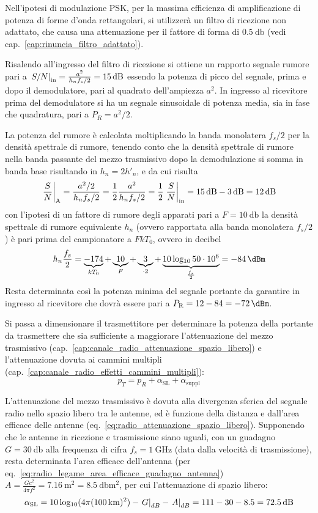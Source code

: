 Nell'ipotesi di modulazione \ac{PSK}, per la massima efficienza di amplificazione di potenza di forme d'onda rettangolari, si utilizzerà un filtro di ricezione non adattato, che causa una attenuazione per il fattore di forma di $\SI{0.5}{\decibel}$ (vedi cap.~\ref{cap:rinuncia_filtro_adattato}). 

Risalendo all'ingresso del filtro di ricezione si ottiene un rapporto segnale rumore pari a $\restrict{S/N}{\text{in}}=\frac{a^2}{h_n f_s/2}=\SI{15}{\decibel}$ essendo la potenza di picco del segnale, prima e dopo il demodulatore, pari al quadrato dell'ampiezza $a^2$. In ingresso al ricevitore prima del demodulatore si ha un segnale sinusoidale di potenza media, sia in fase che quadratura, pari a $P_R=a^2/2$.

La potenza del rumore è calcolata moltiplicando la banda monolatera $f_s/2$ per la densità spettrale di rumore, tenendo conto che la densità spettrale di rumore nella banda passante del mezzo trasmissivo dopo la demodulazione si somma in banda base risultando in $h_n=2 h'_n$, e da cui risulta
\[\restrict{\frac{S}{N}}{\text{A}}=\frac{a^2/2}{h_n f_s/2}=\frac{1}{2}\frac{a^2}{h_n f_s/2}=\frac{1}{2}\restrict{\frac{S}{N}}{\text{in}}=\SI{15}{\decibel}-\SI{3}{\decibel}=\SI{12}{\decibel}\]
con l'ipotesi di un fattore di rumore degli apparati pari a $F=\SI{10}{\decibel}$ la densità spettrale di rumore equivalente $h_n$ (ovvero rapportata alla banda monolatera $f_s/2$) è pari prima del campionatore a $F k T_0$, ovvero in decibel
\[h_n \frac{f_s}{2}=\underbrace{-174}_{k T_0}+\underbrace{10}_{F}+\underbrace{3}_{\cdot 2}+\underbrace{10\Log{50\cdot 10^6}}_{\frac{f_s}{2}}=\SI{-84}{\dBm}\]
Resta determinata così la potenza minima del segnale portante da garantire in ingresso al ricevitore che dovrà essere pari a $P_\text{R}=12-84=\SI{-72}{\dBm}$.

Si passa a dimensionare il trasmettitore per determinare la potenza della portante da trasmettere che sia sufficiente a maggiorare l'attenuazione del mezzo trasmissivo (cap.~\ref{cap:canale_radio_attenuazione_spazio_libero}) e l'attenuazione dovuta ai cammini multipli (cap.~\ref{cap:canale_radio_effetti_cammini_multipli}):
\[p_T=p_R+\alpha_\text{SL}+\alpha_\text{suppl}\]

L'attenuazione del mezzo trasmissivo è dovuta alla divergenza sferica del segnale radio nello spazio libero tra le antenne, ed è funzione della distanza e dall'area efficace delle antenne (eq.~\ref{eq:radio_attenuazione_spazio_libero}). Supponendo che le antenne in ricezione e trasmissione siano uguali, con un guadagno $G=\SI{30}{\decibel}$ alla frequenza di cifra $f_s=\SI{1}{\giga\hertz}$ (data dalla velocità di trasmissione), resta determinata l'area efficace dell'antenna (per eq.~\ref{eq:radio_legame_area_efficace_guadagno_antenna}) $A=\frac{G c^2}{4\pi f^2}=\SI{7.16}{\meter\squared}=\SI{8.5}{\decibel\meter\squared}$, per cui l'attenuazione di spazio libero:
\[\alpha_\text{SL}=10\Log(4\pi(\SI{100}{\kilo\meter})^2)-\restrict{G}{dB}-\restrict{A}{dB}=111-30-8.5=\SI{72.5}{\decibel}\]

